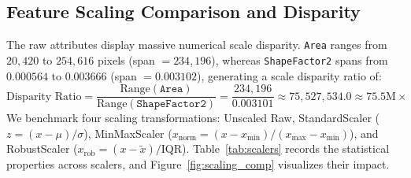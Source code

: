 \documentclass[11pt,a4paper]{article}
\begin{document}
\subsection{Feature Scaling Comparison and Disparity}
\label{subsec:feature_scaling}

The raw attributes display massive numerical scale disparity. \texttt{Area} ranges from $20{,}420$ to $254{,}616$ pixels (span $= 234{,}196$), whereas \texttt{ShapeFactor2} spans from $0.000564$ to $0.003666$ (span $= 0.003102$), generating a scale disparity ratio of:
\begin{equation}
    \text{Disparity Ratio} = \frac{\text{Range}(\texttt{Area})}{\text{Range}(\texttt{ShapeFactor2})} = \frac{234{,}196}{0.003101} \approx 75{,}527{,}534.0 \approx 75.5\text{M}\times
\end{equation}
We benchmark four scaling transformations: Unscaled Raw, StandardScaler ($z = (x - \mu)/\sigma$), MinMaxScaler ($x_{\text{norm}} = (x - x_{\min})/(x_{\max} - x_{\min})$), and RobustScaler ($x_{\text{rob}} = (x - \tilde{x})/\text{IQR}$). Table~\ref{tab:scalers} records the statistical properties across scalers, and Figure~\ref{fig:scaling_comp} visualizes their impact.
\end{document}
